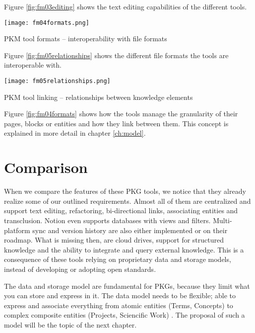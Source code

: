Figure \ref{fig:fm03editing} shows the text editing capabilities of the different tools.


\begin{table}[H]
    \centering
    \texttt{[image: fm04formats.png]}
    \caption{PKM tool formats -- interoperability with file formats}
    \label{fig:fm04formats}
\end{table}

Figure \ref{fig:fm05relationships} shows the different file formats the tools are interoperable with.


\begin{table}[H]
    \centering
    \texttt{[image: fm05relationships.png]}
    \caption{PKM tool linking -- relationships between knowledge elements}
    \label{fig:fm05relationships}
\end{table}

Figure \ref{fig:fm04formats} shows how the tools manage the granularity of their pages, blocks or entities and how they link between them. This concept is explained in more detail in chapter \ref{ch:model}.

\section{Comparison}

When we compare the features of these PKG tools, we notice that they already realize some of our outlined requirements. Almost all of them are centralized and support text editing, refactoring, bi-directional links, associating entities and transclusion. Notion even supports databases with views and filters. Multi-platform sync and version history are also either implemented or on their roadmap. What is missing then, are cloud drives, support for structured knowledge and the ability to integrate and query external knowledge. This is a consequence of these tools relying on proprietary data and storage models, instead of developing or adopting open standards.

The data and storage model are fundamental for PKGs, because they limit what you can store and express in it. The data model needs to be flexible; able to express and associate everything from atomic entities (Terms, Concepts) to complex composite entities (Projects, Sciencific Work) \cite{Davies2005Memex60}. The proposal of such a model will be the topic of the next chapter.
